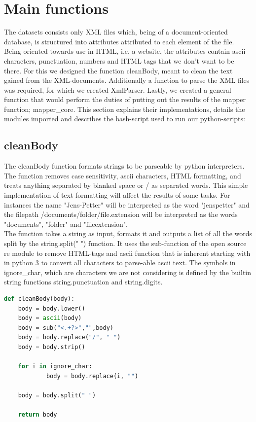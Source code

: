 \documentclass[fleqn,10pt]{wlscirep}
\begin{document}
\section{Main functions}
The datasets consists only XML files which, being of a document-oriented database, is structured into attributes attributed to each element of the file. Being oriented towards use in HTML, i.e. a website, the attributes contain ascii characters, punctuation, numbers and HTML tags that we don't want to be there. For this we designed the function cleanBody, meant to clean the text gained from the XML-documents. Additionally a function to parse the XML files was required, for which we created XmlParser. Lastly, we created a general function that would perform the duties of putting out the results of the mapper function; mapper\_core. This section explains their implementations, details the modules imported and describes the bash-script used to run our python-scripts: 


\subsection{cleanBody}
The cleanBody function formats strings to be parseable by python interpreters. The function removes case sensitivity, ascii characters, HTML formatting, and treats anything separated by blanked space or / as separated words. This simple implementation of text formatting will affect the results of some tasks. For instances the name "Jens-Petter" will be interpreted as the word "jenspetter" and the filepath /documents/folder/file.extension will be interpreted as the words "documents", "folder" and "fileextension". \\
The function takes a string as input, formats it and outputs a list of all the words split by the string.split(" ") function.
It uses the sub-function of the open source re module to remove HTML-tags and ascii function that is inherent starting with in python 3 to convert all characters to parse-able ascii text. The symbols in ignore\_char, which are characters we are not considering is defined by the builtin string functions string.punctuation and string.digits.
\begin{lstlisting}[language=Python, caption=cleanBody function]
def cleanBody(body):
    body = body.lower()
    body = ascii(body)
    body = sub("<.+?>","",body)
    body = body.replace("/", " ")
    body = body.strip()

    for i in ignore_char:
        	body = body.replace(i, "")

    body = body.split(" ")

    return body
\end{lstlisting}
\end{document}
